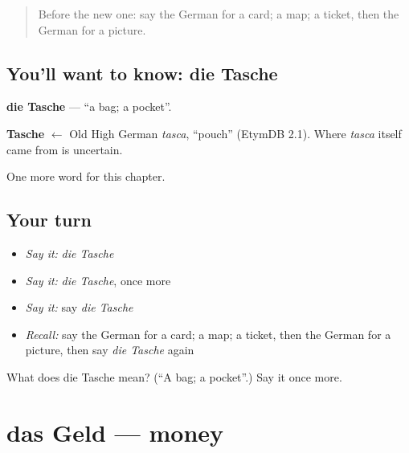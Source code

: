 \label{lesson:GE-C81-tasche}



\begin{quote}
Before the new one: say the German for a card; a map; a ticket, then the German for a picture.
\end{quote}

\subsection*{You'll want to know: die Tasche}
\textbf{die Tasche} — \textquotedblleft{}a bag; a pocket\textquotedblright{}.

\begin{cousinweb}
\textbf{Tasche} $\leftarrow$ Old High German \emph{tasca}, \textquotedblleft{}pouch\textquotedblright{} (EtymDB 2.1). Where \emph{tasca} itself came from is uncertain.
\end{cousinweb}

\begin{grammarlens}[title={What you've built}]
One more word for this chapter.
\end{grammarlens}

\subsection*{Your turn}
\begin{itemize}
\raggedright
  \item \emph{Say it:} \emph{die Tasche}
  \item \emph{Say it:} \emph{die Tasche}, once more
  \item \emph{Say it:} say \emph{die Tasche}
  \item \emph{Recall:} say the German for a card; a map; a ticket, then the German for a picture, then say \emph{die Tasche} again
\end{itemize}

\begin{tcolorbox}[breakable,colback=teal!4,colframe=teal!35!black,title={Before you move on}]
What does die Tasche mean? (\textquotedblleft{}A bag; a pocket\textquotedblright{}.) Say it once more.
\end{tcolorbox}
\section[das Geld]{das Geld — money}

\label{lesson:GE-C81-geld}



